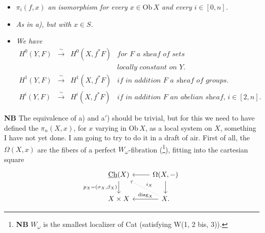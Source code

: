 \documentclass[11pt]{article}
\newcommand{\printedpage}[1]{\marginpar{\footnotesize p.~#1}}
\newcommand{\msp}[1]{\marginpar{\footnotesize [#1]}}
\newcommand{\Ch}{\underline{\mathrm{Ch}}}
\newcommand{\Ob}{\mathrm{Ob}\,}
\begin{document}
\begin{itemize}
\item[\textit{a)}] \textit{$\pi_i(f,x)$ an isomorphism for every $x \in \Ob X$ and every $i \in [0,n]$.}

\item[\textit{a$'$)}] \textit{As in a), but with $x \in S$.}

\item[\textit{b)}] \textit{We have}
\[
\begin{array}{rcll}
H^0(Y,F) & \xrightarrow{\ \sim\ } & H^0(X,f^*F) & \textit{for $F$ a sheaf of sets}\\
 & & & \textit{locally constant on $Y$.}\\
H^1(Y,F) & \xrightarrow{\ \sim\ } & H^1(X,f^*F) & \textit{if in addition $F$ a sheaf of groups.}\\
H^i(Y,F) & \xrightarrow{\ \sim\ } & H^i(X,f^*F) & \textit{if in addition $F$ an abelian sheaf, $i \in [2,n]$.}
\end{array}
\]
\end{itemize}

\msp{page 173}

\textbf{NB} The equivalence of a) and a$'$) should be trivial, but for this we need to have defined the $\pi_n(X,x)$, for $x$ varying in $\Ob X$, as a local system on $X$, something I have not yet done. I am going to try to do it in a draft of air. First of all, the $\Omega(X,x)$ are the fibers of a perfect $W_\omega$-fibration (\footnote[113]{\textbf{NB} $W_\omega$ is the smallest localizer of Cat (satisfying W(1, 2 bis, 3)).}), fitting into the cartesian square
\[
\begin{tikzcd}
\Ch(X) \arrow[d, "{p_X=(\sigma_X,\beta_X)}"'] & \Omega(X,-) \arrow[l] \arrow[d] \\
X \times X & X. \arrow[l, "\mathrm{diag}_X"'] \arrow[ul, dotted, "i_X"']
\end{tikzcd}
\]

\clearpage

\printedpage{117}
\end{document}
